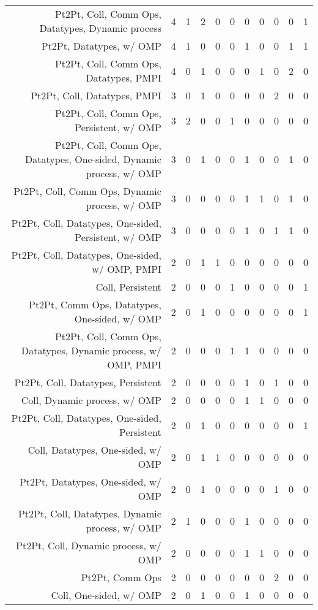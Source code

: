{\begin{landscape}
\begin{longtable}[htb]{r|c|c|c|c|c|c|c|c|c|c}
{Pt2Pt, Coll, Comm Ops, Datatypes, Dynamic process} & 4 & 1 & 2 & 0 & 0 & 0 & 0 & 0 & 0 & 1 \\%
{Pt2Pt, Datatypes, w/ OMP} & 4 & 1 & 0 & 0 & 0 & 1 & 0 & 0 & 1 & 1 \\%
{Pt2Pt, Coll, Comm Ops, Datatypes, PMPI} & 4 & 0 & 1 & 0 & 0 & 0 & 1 & 0 & 2 & 0 \\%
{Pt2Pt, Coll, Datatypes, PMPI} & 3 & 0 & 1 & 0 & 0 & 0 & 0 & 2 & 0 & 0 \\%
{Pt2Pt, Coll, Comm Ops, Persistent, w/ OMP} & 3 & 2 & 0 & 0 & 1 & 0 & 0 & 0 & 0 & 0 \\%
{Pt2Pt, Coll, Comm Ops, Datatypes, One-sided, Dynamic process, w/ OMP} & 3 & 0 & 1 & 0 & 0 & 1 & 0 & 0 & 1 & 0 \\%
{Pt2Pt, Coll, Comm Ops, Dynamic process, w/ OMP} & 3 & 0 & 0 & 0 & 0 & 1 & 1 & 0 & 1 & 0 \\%
{Pt2Pt, Coll, Datatypes, One-sided, Persistent, w/ OMP} & 3 & 0 & 0 & 0 & 0 & 1 & 0 & 1 & 1 & 0 \\%
{Pt2Pt, Coll, Datatypes, One-sided, w/ OMP, PMPI} & 2 & 0 & 1 & 1 & 0 & 0 & 0 & 0 & 0 & 0 \\%
{Coll, Persistent} & 2 & 0 & 0 & 0 & 1 & 0 & 0 & 0 & 0 & 1 \\%
{Pt2Pt, Comm Ops, Datatypes, One-sided, w/ OMP} & 2 & 0 & 1 & 0 & 0 & 0 & 0 & 0 & 0 & 1 \\%
{Pt2Pt, Coll, Comm Ops, Datatypes, Dynamic process, w/ OMP, PMPI} & 2 & 0 & 0 & 0 & 1 & 1 & 0 & 0 & 0 & 0 \\%
{Pt2Pt, Coll, Datatypes, Persistent} & 2 & 0 & 0 & 0 & 0 & 1 & 0 & 1 & 0 & 0 \\%
{Coll, Dynamic process, w/ OMP} & 2 & 0 & 0 & 0 & 0 & 1 & 1 & 0 & 0 & 0 \\%
{Pt2Pt, Coll, Datatypes, One-sided, Persistent} & 2 & 0 & 1 & 0 & 0 & 0 & 0 & 0 & 0 & 1 \\%
{Coll, Datatypes, One-sided, w/ OMP} & 2 & 0 & 1 & 1 & 0 & 0 & 0 & 0 & 0 & 0 \\%
{Pt2Pt, Datatypes, One-sided, w/ OMP} & 2 & 0 & 1 & 0 & 0 & 0 & 0 & 1 & 0 & 0 \\%
{Pt2Pt, Coll, Datatypes, Dynamic process, w/ OMP} & 2 & 1 & 0 & 0 & 0 & 1 & 0 & 0 & 0 & 0 \\%
{Pt2Pt, Coll, Dynamic process, w/ OMP} & 2 & 0 & 0 & 0 & 0 & 1 & 1 & 0 & 0 & 0 \\%
{Pt2Pt, Comm Ops} & 2 & 0 & 0 & 0 & 0 & 0 & 0 & 2 & 0 & 0 \\%
{Coll, One-sided, w/ OMP} & 2 & 0 & 1 & 0 & 0 & 1 & 0 & 0 & 0 & 0 \\%

\end{longtable}
\end{landscape}}
